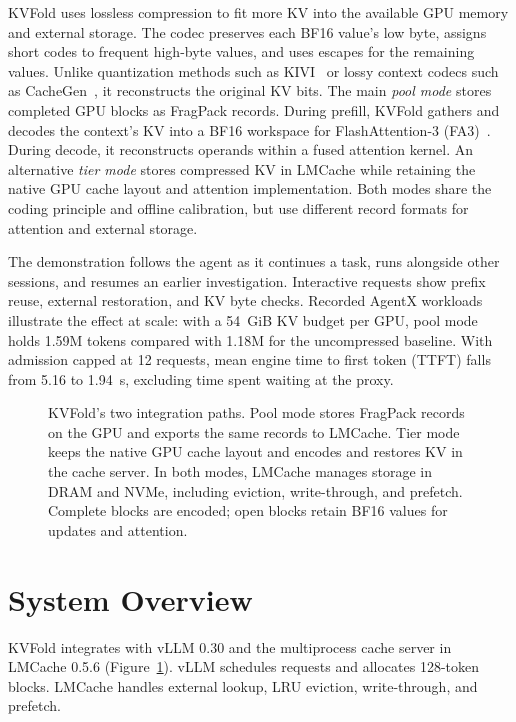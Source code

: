 \documentclass[conference]{IEEEtran}
\begin{document}
KVFold uses lossless compression to fit more KV into the available GPU
memory and external storage. The codec preserves each BF16 value's low
byte, assigns short codes to frequent high-byte values, and uses escapes
for the remaining values. Unlike quantization methods such as
KIVI~\cite{kivi} or lossy context codecs such as CacheGen~\cite{cachegen},
it reconstructs the original KV bits. The main \emph{pool mode} stores
completed GPU blocks as FragPack records. During prefill, KVFold gathers
and decodes the context's KV into a BF16 workspace for FlashAttention-3
(FA3)~\cite{fa3}. During decode, it reconstructs operands within a fused
attention kernel. An alternative \emph{tier mode} stores compressed KV in
LMCache while retaining the native GPU cache layout and attention
implementation. Both modes share the coding principle and offline
calibration, but use different record formats for attention and external
storage.

The demonstration follows the agent as it continues a task, runs alongside
other sessions, and resumes an earlier investigation. Interactive requests
show prefix reuse, external restoration, and KV byte checks.
Recorded AgentX workloads~\cite{agentx} illustrate the effect at scale:
with a 54~GiB KV budget per GPU, pool mode holds 1.59M tokens compared
with 1.18M for the uncompressed baseline. With admission capped at
12 requests, mean engine time to first token (TTFT) falls from 5.16 to
1.94~s, excluding time spent waiting at the proxy.

\begin{figure}[t]
\centering

\caption{KVFold's two integration paths. Pool mode stores FragPack records
on the GPU and exports the same records to LMCache. Tier mode keeps the
native GPU cache layout and encodes and restores KV in the cache server.
In both modes, LMCache manages storage in DRAM and NVMe, including eviction,
write-through, and prefetch. Complete blocks are encoded; open blocks retain
BF16 values for updates and attention.}
\label{fig:architecture}
\end{figure}

\section{System Overview}
\label{sec:design}
KVFold integrates with vLLM 0.30 and the multiprocess cache server in
LMCache 0.5.6 (Figure~\ref{fig:architecture}). vLLM schedules requests and
allocates 128-token blocks. LMCache handles external lookup, LRU eviction,
write-through, and prefetch.
\end{document}
